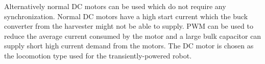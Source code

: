 Alternatively normal DC motors can be used which do not require any synchronization.
Normal DC motors have a high start current which the buck converter from the harvester might not be able to supply.
PWM can be used to reduce the average current consumed by the motor and a large bulk capacitor can supply short high current demand from the motors.
The DC motor is chosen as the locomotion type used for the transiently-powered robot.
